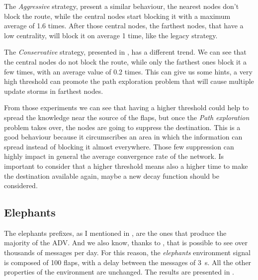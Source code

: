 The \textit{Aggressive} strategy,  present
a similar behaviour, the nearest nodes don't block the route, while the central
nodes start blocking it with a maximum average of \num{1.6} times.
After those central nodes, the farthest nodes, that have a low centrality, will
block it on average \num{1} time, like the legacy strategy.

The \textit{Conservative} strategy, presented in ,
has a different trend.
We can see that the central nodes do not block the route, while only the farthest
ones block it a few times, with an average value of \num{0.2} times.
This can give us some hints, a very high threshold can promote the path
exploration problem that will cause multiple update storms in farthest nodes.

From those experiments we can see that having a higher threshold could help
to spread the knowledge near the source of the flaps, but once the
\textit{Path exploration} problem takes over, the nodes are going to suppress
the destination.
This is a good behaviour because it circumscribes an area in which the
information can spread instead of blocking it almost everywhere.
Those few suppression can highly impact in general the average convergence rate
of the network.
Is important to consider that a higher threshold means also a higher time to
make the destination available again, maybe a new decay function should be considered.


\subsection{Elephants}
\label{subsec:rfd_elephants}


The elephants prefixes, as I mentioned in ,
are the ones that produce the majority of the \ac{ADV}.
And we also know, thanks to \cite{huston2006bgp}, that is possible to see over
thousands of messages per day.
For this reason, the \textit{elephants} environment signal is composed of \num{100}
flaps, with a delay between the messages of \SI{3}{\second}.
All the other properties of the environment are unchanged.
The results are presented in .

